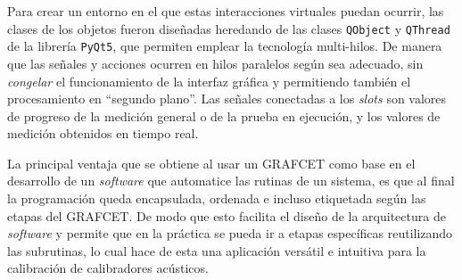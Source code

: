 Para crear un entorno en el que estas interacciones virtuales puedan ocurrir, las clases de los objetos fueron diseñadas heredando de las clases {\small \texttt{QObject}} y {\small \texttt{QThread}} de la librería {\small \texttt{PyQt5}}, que permiten emplear la tecnología multi-hilos.
De manera que las señales y acciones ocurren en hilos paralelos según sea adecuado, sin \emph{congelar} el funcionamiento de la interfaz gráfica y permitiendo también el procesamiento en ``segundo plano''.
Las señales conectadas a los \emph{slots} son valores de progreso de la medición general o de la prueba en ejecución, y los valores de medición obtenidos en tiempo real.

La principal ventaja que se obtiene al usar un GRAFCET como base en el desarrollo de un \emph{software} que automatice las rutinas de un sistema, es que al final la programación queda encapsulada, ordenada e incluso etiquetada según las etapas del GRAFCET. De modo que esto facilita el diseño de la arquitectura de \emph{software} y permite que en la práctica se pueda ir a etapas específicas reutilizando las subrutinas, lo cual hace de esta una aplicación versátil e intuitiva para la calibración de calibradores acústicos.

\vfill

